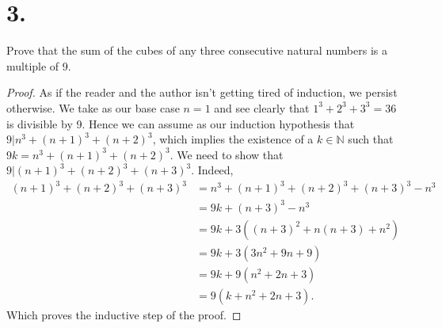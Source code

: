 \documentclass[]{article}
\begin{document}
\section*{3.}
Prove that the sum of the cubes of any three consecutive natural numbers is a multiple of 9.
\begin{proof}
	As if the reader and the author isn't getting tired of induction, we persist otherwise. We take as our base case $n = 1$ and see clearly that $1^3 + 2^3 + 3^3 = 36$ is divisible by 9. Hence we can assume as our induction hypothesis that $9 | n^3 + (n + 1)^3 + (n + 2)^3$, which implies the existence of a $k \in \mathbb{N}$ such that $9k = n^3 + (n + 1)^3 + (n + 2)^3$. We need to show that $9 | (n + 1)^3 + (n + 2)^3 + (n + 3)^3$. Indeed,
	\begin{align*}
		(n + 1)^3 + (n + 2)^3 + (n + 3)^3 &= n^3 + (n + 1)^3 + (n + 2)^3 + (n + 3)^3 - n^3 \\
		&= 9k + (n + 3)^3 - n^3 \\
		&= 9k + 3((n + 3)^2 + n(n+3) + n^2) \\
		&= 9k + 3(3n^2 + 9n + 9) \\
		&= 9k + 9(n^2 + 2n + 3) \\
		&= 9(k + n^2 + 2n + 3).
	\end{align*}
	Which proves the inductive step of the proof.
\end{proof}
\end{document}
